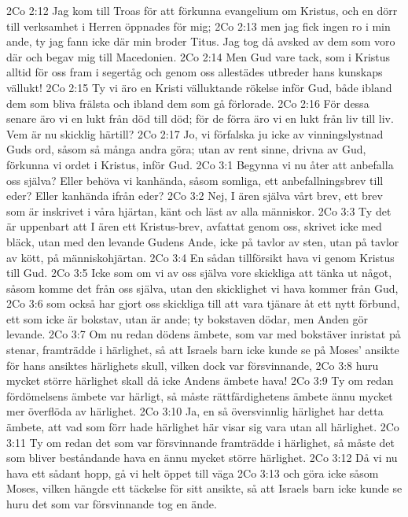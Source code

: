 2Co 2:12  Jag kom till Troas för att förkunna evangelium om Kristus, och en dörr till verksamhet i Herren öppnades för mig;
2Co 2:13  men jag fick ingen ro i min ande, ty jag fann icke där min broder Titus. Jag tog då avsked av dem som voro där och begav mig till Macedonien.
2Co 2:14  Men Gud vare tack, som i Kristus alltid för oss fram i segertåg och genom oss allestädes utbreder hans kunskaps vällukt!
2Co 2:15  Ty vi äro en Kristi välluktande rökelse inför Gud, både ibland dem som bliva frälsta och ibland dem som gå förlorade.
2Co 2:16  För dessa senare äro vi en lukt från död till död; för de förra äro vi en lukt från liv till liv. Vem är nu skicklig härtill?
2Co 2:17  Jo, vi förfalska ju icke av vinningslystnad Guds ord, såsom så många andra göra; utan av rent sinne, drivna av Gud, förkunna vi ordet i Kristus, inför Gud.
2Co 3:1  Begynna vi nu åter att anbefalla oss själva? Eller behöva vi kanhända, såsom somliga, ett anbefallningsbrev till eder? Eller kanhända ifrån eder?
2Co 3:2  Nej, I ären själva vårt brev, ett brev som är inskrivet i våra hjärtan, känt och läst av alla människor.
2Co 3:3  Ty det är uppenbart att I ären ett Kristus-brev, avfattat genom oss, skrivet icke med bläck, utan med den levande Gudens Ande, icke på tavlor av sten, utan på tavlor av kött, på människohjärtan.
2Co 3:4  En sådan tillförsikt hava vi genom Kristus till Gud.
2Co 3:5  Icke som om vi av oss själva vore skickliga att tänka ut något, såsom komme det från oss själva, utan den skicklighet vi hava kommer från Gud,
2Co 3:6  som också har gjort oss skickliga till att vara tjänare åt ett nytt förbund, ett som icke är bokstav, utan är ande; ty bokstaven dödar, men Anden gör levande.
2Co 3:7  Om nu redan dödens ämbete, som var med bokstäver inristat på stenar, framträdde i härlighet, så att Israels barn icke kunde se på Moses' ansikte för hans ansiktes härlighets skull, vilken dock var försvinnande,
2Co 3:8  huru mycket större härlighet skall då icke Andens ämbete hava!
2Co 3:9  Ty om redan fördömelsens ämbete var härligt, så måste rättfärdighetens ämbete ännu mycket mer överflöda av härlighet.
2Co 3:10  Ja, en så översvinnlig härlighet har detta ämbete, att vad som förr hade härlighet här visar sig vara utan all härlighet.
2Co 3:11  Ty om redan det som var försvinnande framträdde i härlighet, så måste det som bliver beståndande hava en ännu mycket större härlighet.
2Co 3:12  Då vi nu hava ett sådant hopp, gå vi helt öppet till väga
2Co 3:13  och göra icke såsom Moses, vilken hängde ett täckelse för sitt ansikte, så att Israels barn icke kunde se huru det som var försvinnande tog en ände.
